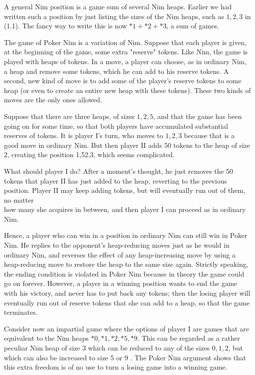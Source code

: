 \documentclass[12pt]{article}
\begin{document}
A general Nim position is a game sum of several Nim heaps. Earlier we had written such a position by just listing the sizes of the Nim heaps, such as $1,2,3$ in (1.1). The fancy way to write this is now $* 1+* 2+* 3$, a sum of games.

The game of Poker Nim is a variation of Nim. Suppose that each player is given, at the beginning of the game, some extra "reserve" tokens. Like Nim, the game is played with heaps of tokens. In a move, a player can choose, as in ordinary Nim, a heap and remove some tokens, which he can add to his reserve tokens. A second, new kind of move is to add some of the player's reserve tokens to some heap (or even to create an entire new heap with these tokens). These two kinds of moves are the only ones allowed.

Suppose that there are three heaps, of sizes $1,2,5$, and that the game has been going on for some time, so that both players have accumulated substantial reserves of tokens. It is player I's turn, who moves to $1,2,3$ because that is a good move in ordinary Nim. But then player II adds 50 tokens to the heap of size 2, creating the position 1,52,3, which seems complicated.

What should player I do? After a moment's thought, he just removes the 50 tokens that player II has just added to the heap, reverting to the previous position. Player II may keep adding tokens, but will eventually run out of them, no matter\\
how many she acquires in between, and then player I can proceed as in ordinary Nim.

Hence, a player who can win in a position in ordinary Nim can still win in Poker Nim. He replies to the opponent's heap-reducing moves just as he would in ordinary Nim, and reverses the effect of any heap-increasing move by using a heap-reducing move to restore the heap to the same size again. Strictly speaking, the ending condition is violated in Poker Nim because in theory the game could go on forever. However, a player in a winning position wants to end the game with his victory, and never has to put back any tokens; then the losing player will eventually run out of reserve tokens that she can add to a heap, so that the game terminates.

Consider now an impartial game where the options of player I are games that are equivalent to the Nim heaps $* 0, * 1, * 2, * 5, * 9$. This can be regarded as a rather peculiar Nim heap of size 3 which can be reduced to any of the sizes $0,1,2$, but which can also be increased to size 5 or 9 . The Poker Nim argument shows that this extra freedom is of no use to turn a losing game into a winning game.
\end{document}
